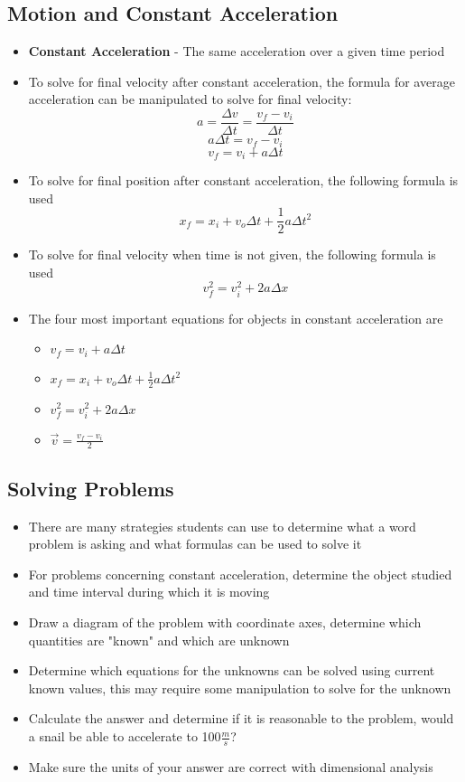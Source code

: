 \subsection{Motion and Constant Acceleration}
\begin{itemize}
    \item \textbf{Constant Acceleration} - The same acceleration over a given time period
    \item To solve for final velocity after constant acceleration, the formula for average acceleration can be manipulated to solve for final velocity: \[a=\frac{\Delta v}{\Delta t}=\frac{v_f-v_i}{\Delta t}\]
    \[a\Delta t =v_f-v_i\]
    \[v_f=v_i+a\Delta t\]
    \item To solve for final position after constant acceleration, the following formula is used \[x_f=x_i+v_o\Delta t+\frac{1}{2}a\Delta t^2\]
    \item To solve for final velocity when time is not given, the following formula is used \[v_f^2=v_i^2+2a\Delta x\]
    \item The four most important equations for objects in constant acceleration are 
    \begin{itemize}
        \item $v_f=v_i+a\Delta t$
        \item $x_f=x_i+v_o\Delta t+\frac{1}{2}a\Delta t^2$
        \item $v_f^2=v_i^2+2a\Delta x$
        \item $\vec{v}=\frac{v_f-v_i}{2}$
    \end{itemize}
\end{itemize}

\subsection{Solving Problems}
\begin{itemize}
    \item There are many strategies students can use to determine what a word problem is asking and what formulas can be used to solve it
    \item For problems concerning constant acceleration, determine the object studied and time interval during which it is moving 
    \item Draw a diagram of the problem with coordinate axes, determine which quantities are "known" and which are unknown
    \item Determine which equations for the unknowns can be solved using current known values, this may require some manipulation to solve for the unknown
    \item Calculate the answer and determine if it is reasonable to the problem, would a snail be able to accelerate to 100$\frac{m}{s}$? 
    \item Make sure the units of your answer are correct with dimensional analysis
\end{itemize}

